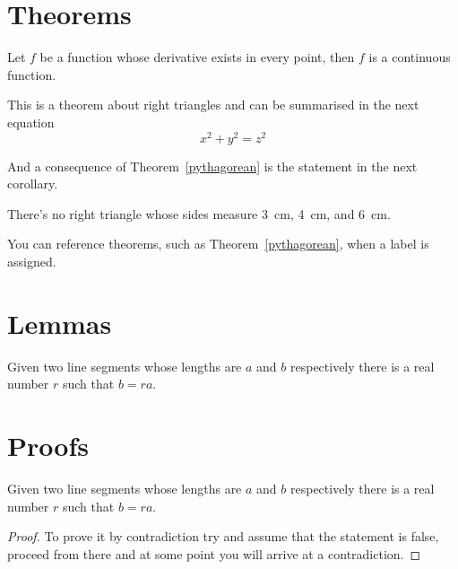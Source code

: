 \blindtext

\section{Theorems}

\begin{theorem}
  Let \(f\) be a function whose derivative exists in every point, then \(f\) is
  a continuous function.
\end{theorem}

\begin{theorem}
  \label{pythagorean}
  This is a theorem about right triangles and can be summarised in the next
  equation
  \[ x^2 + y^2 = z^2 \]
\end{theorem}

And a consequence of Theorem~\ref{pythagorean} is the statement in the next corollary.

\begin{corollary}
  There's no right triangle whose sides measure 3~cm, 4~cm, and 6~cm.
\end{corollary}

You can reference theorems, such as Theorem~\ref{pythagorean}, when a label is assigned.

\blindtext

\section{Lemmas}

\begin{lemma}
  Given two line segments whose lengths are \(a\) and \(b\) respectively there is a
  real number \(r\) such that \(b=ra\).
\end{lemma}

\blindtext

\section{Proofs}

\begin{lemma}
  Given two line segments whose lengths are \(a\) and \(b\) respectively there
  is a real number \(r\) such that \(b=ra\).
\end{lemma}

\begin{proof}
  To prove it by contradiction try and assume that the statement is false,
  proceed from there and at some point you will arrive at a contradiction.
\end{proof}

